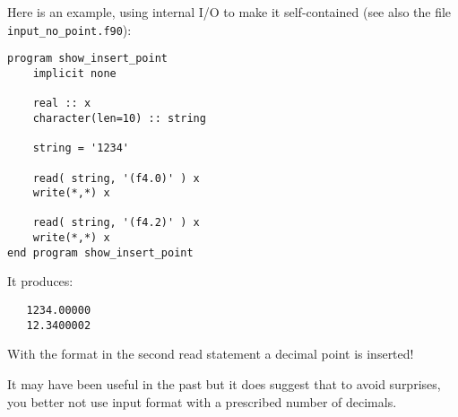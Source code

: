 Here is an example, using internal I/O to make it self-contained (see also the file \verb+input_no_point.f90+):
\begin{verbatim}
program show_insert_point
    implicit none

    real :: x
    character(len=10) :: string

    string = '1234'

    read( string, '(f4.0)' ) x
    write(*,*) x

    read( string, '(f4.2)' ) x
    write(*,*) x
end program show_insert_point
\end{verbatim}
It produces:
\begin{verbatim}
   1234.00000
   12.3400002
\end{verbatim}
With the format in the second read statement a decimal point is inserted!

It may have been useful in the past but it does suggest that to avoid surprises, you better not
use input format with a prescribed number of decimals.


